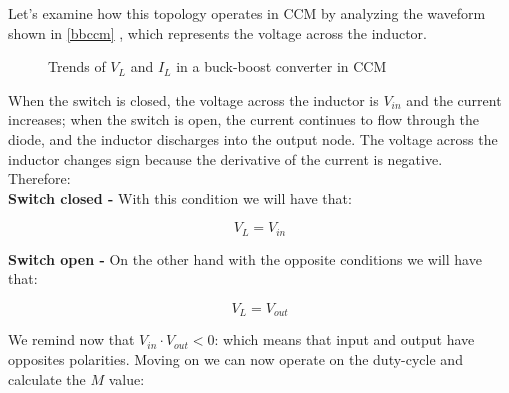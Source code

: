 \documentclass[../main.tex]{subfiles}
\begin{document}
Let’s examine how this topology operates in CCM by analyzing the waveform shown in \autoref{bbccm} , which represents the voltage across the inductor. 

\begin{figure}[h!]
\begin{center}




\label{bbccm}
\caption{Trends of $V_L$ and $I_L$ in a buck-boost converter in CCM}	
\end{center}
\end{figure}



When the switch is closed, the voltage across the inductor is $V_{in}$ and the current increases; when the switch is open, the current continues to flow through the diode, and the inductor discharges into the output node. The voltage across the inductor changes sign because the derivative of the current is negative. \\

Therefore:\\

\textbf{Switch closed -} With this condition we will have that:

\begin{equation}
	V_L = V_{in}
\end{equation}

\textbf{Switch open -} On the other hand with the opposite conditions we will have that:

\begin{equation}
	V_{L} = V_{out}
\end{equation}

We remind now that $V_{in} \cdot V_{out} < 0$: which means that input and output have opposites polarities.
Moving on we can now operate on the duty-cycle and calculate the $M$ value:
\end{document}
